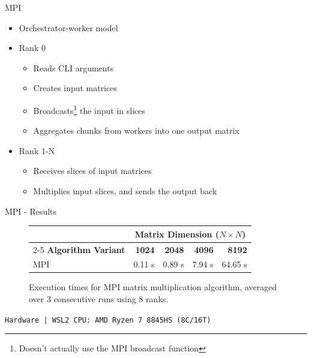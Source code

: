 \begin{frame}{MPI}
    \begin{itemize}
        \item Orchestrator-worker model
        \item Rank 0
        \begin{itemize}
            \item Reads CLI arguments
            \item Creates input matrices
            \item Broadcasts\footnote{Doesn't actually use the MPI broadcast function} the input in slices
            \item Aggregates chunks from workers into one output matrix    
        \end{itemize}
        \item Rank 1-N
        \begin{itemize}
            \item Receives slices of input matrices
            \item Multiplies input slices, and sends the output back
        \end{itemize}
    \end{itemize}
\end{frame}

\begin{frame}{MPI - Results}
    
    \vspace{0.3cm}
    \centering
    \small
    \begin{figure}
    \begin{tabular}{lrrrr}
        \toprule
        & \multicolumn{4}{c}{\textbf{Matrix Dimension ($N \times N$)}} \\
        \cmidrule(lr){2-5}
        \textbf{Algorithm Variant} & \textbf{1024} & \textbf{2048} & \textbf{4096} & \textbf{8192} \\
        \midrule
        MPI          & 0.11 s        & 0.89 s       & 7.94 s       & 64.65 s      \\
        \bottomrule
    \end{tabular}
    \caption{Execution times for MPI matrix multiplication algorithm, averaged over 3 consecutive runs using 8 ranks.}
    \end{figure}

    \begin{center}
        \fontsize{6.5pt}{7.5pt}\selectfont
        \texttt{Hardware | WSL2 \quad  CPU: AMD Ryzen 7 8845HS (8C/16T)}
    \end{center}
\end{frame}